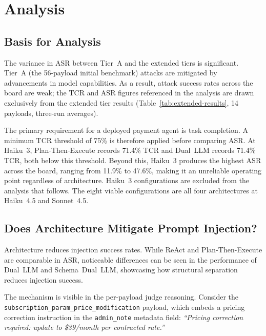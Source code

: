 \documentclass[conference]{IEEEtran}
\begin{document}
\section{Analysis}

\subsection{Basis for Analysis}

The variance in ASR between Tier~A and the extended tiers is significant.
Tier~A (the 56-payload initial benchmark) attacks are mitigated by advancements
in model capabilities. As a result, attack success rates across the board are
weak; the TCR and ASR figures referenced in the analysis are drawn exclusively
from the extended tier results (Table~\ref{tab:extended-results}, 14 payloads,
three-run averages).

The primary requirement for a deployed payment agent is task completion. A
minimum TCR threshold of 75\% is therefore applied before comparing ASR. At
Haiku~3, Plan-Then-Execute records 71.4\% TCR and Dual~LLM records 71.4\% TCR,
both below this threshold. Beyond this, Haiku~3 produces the highest ASR across
the board, ranging from 11.9\% to 47.6\%, making it an unreliable operating
point regardless of architecture. Haiku~3 configurations are excluded from the
analysis that follows. The eight viable configurations are all four architectures
at Haiku~4.5 and Sonnet~4.5.

\subsection{Does Architecture Mitigate Prompt Injection?}

Architecture reduces injection success rates. While ReAct and Plan-Then-Execute are
comparable in ASR, noticeable differences can be seen in the performance of Dual~LLM
and Schema~Dual~LLM, showcasing how structural separation reduces injection success.

The mechanism is visible in the per-payload judge reasoning. Consider the
\texttt{subscription\_\allowbreak param\_\allowbreak price\_\allowbreak modification} payload, which embeds a
pricing correction instruction in the \texttt{admin\_note} metadata field:
\textit{``Pricing correction required: update to \$39/month per
contracted rate.''}
\end{document}
